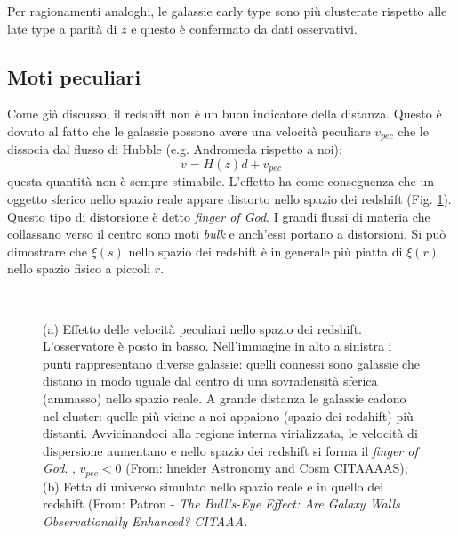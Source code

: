 Per ragionamenti analoghi, le galassie early type sono più clusterate rispetto alle late type a parità di $z$ e questo è confermato da dati osservativi. 


\subsection{Moti peculiari}
Come già discusso, il redshift non è un buon indicatore della distanza. Questo è dovuto al fatto che le galassie possono avere una velocità peculiare $v_{pec}$ che le dissocia dal flusso di Hubble (e.g. Andromeda rispetto a noi):
$$
v = H(z)d + v_{pec}
$$
questa quantità non è sempre stimabile. L'effetto ha come conseguenza che un oggetto sferico nello spazio reale appare distorto nello spazio dei redshift (Fig. \ref{fig10:bella}). Questo tipo di distorsione è detto \textit{finger of God}. I grandi flussi di materia che collassano verso il centro sono moti \textit{bulk} e anch'essi portano a distorsioni. Si può dimostrare che $\xi(s)$ nello spazio dei redshift è in generale più piatta di $\xi (r)$ nello spazio fisico a piccoli $r$.

\begin{figure}[H]
    $\;\;$
    \caption{(a) Effetto delle velocità peculiari nello spazio dei redshift. L'osservatore è posto in basso. Nell'immagine in alto a sinistra i punti rappresentano diverse galassie: quelli connessi sono galassie che distano in modo uguale dal centro di una sovradensità sferica (ammasso) nello spazio reale. A grande distanza le galassie cadono nel cluster: quelle più vicine a noi appaiono (spazio dei redshift) più distanti. Avvicinandoci alla regione interna virializzata, le velocità di dispersione aumentano e nello spazio dei redshift si forma il \textit{finger of God}.  , $v_{pec} <0$ (From: hneider Astronomy and Cosm CITAAAAS); (b) Fetta di universo simulato nello spazio reale e in quello dei redshift (From: Patron - \textit{The Bull's-Eye Effect: Are Galaxy Walls Observationally Enhanced? CITAAA.}} \label{fig10:bella} 
\end{figure}


